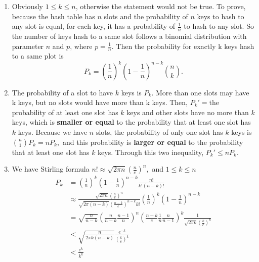 \documentclass{assignment}
\begin{document}
    \maketitle

    \newpage

    \begin{homeworkProblem}
	\begin{enumerate}
	\item
	Obviously $1 \leq k \leq n$, otherwise the statement would not be true. To prove, because the hash table has $n$ slots and the probability of $n$ keys to hash to any slot is equal, for each key, it has a probability of $\frac{1}{n}$ to hash to any slot. So the number of keys hash to a same slot follows a binomial distribution with parameter $n$ and $p$, where $p=\frac{1}{n}$. Then the probability for exactly k keys hash to a same plot is $$P_k = \left(\frac{1}{n}\right)^k \left(1-\frac{1}{n}\right)^{n-k} \binom n k.$$
	\item The probability of a slot to have $k$ keys is $P_k$. More than one slots may have k keys, but no slots would have more than k keys. Then, $P_k' = $the probability of at least one slot has $k$ keys and other slots have no more than $k$ keys, which is \textbf{smaller or equal} to the probability that at least one slot has $k$ keys. Because we have $n$ slots, the probability of only one slot has $k$ keys is $\binom n 1 P_k = nP_k,$ and this probability is \textbf{larger or equal} to the probability that at least one slot has $k$ keys. Through this two inequality, $P_k' \leq nP_k$.
	\item We have Stirling formula $n! \approx \sqrt{2\pi n}\left(\frac{n}{e}\right)^n,$ and $1 \leq k\leq n$
		\begin{equation*}
	\begin{aligned}
	P_k &= \left(\frac{1}{n}\right)^k \left(1-\frac{1}{n}\right)^{n-k} \frac{n!}{k!(n-k)!} \\
	&\approx \frac{\sqrt{2 \pi n}\left(\frac{n}{e}\right)^n}{\sqrt{2 \pi (n-k)}\left(\frac{n-k}{e}\right)^{n-k}k!} \left(\frac{1}{n}\right)^k \left(1-\frac{1}{n}\right)^{n-k} \\
	&=\sqrt{ \frac{n}{n-k}} \left(\frac{n}{n-k} \frac{n-1}{n}\right)^n \left(\frac{n-k}{e} \frac{1}{n}\frac{n}{n-1}\right)^{k} \frac{1}{\sqrt{2 \pi k}\left(\frac{k}{e}\right)^k} \\
	& < \sqrt{ \frac{n}{2 \pi k(n-k)}}   \frac{e^{-k}}{\left(\frac{k}{e}\right)^k} \\
	&< \frac{e^k}{k^k}
	\end{aligned}
	\end{equation*}
	
	
	
	\end{enumerate}
    	
    \end{homeworkProblem}
    
\end{document}
